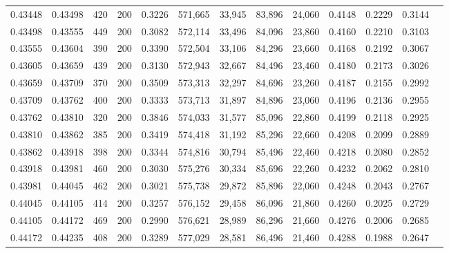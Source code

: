 \begin{tabular}{rrrrrrrrrrrrr}
0.43448 & 0.43498 &   420 & 200 &                                     0.3226 & 571,665 &  33,945 &  83,896 &  24,060 & 0.4148 & 0.2229 & 0.3144 \\
0.43498 & 0.43555 &   449 & 200 &                                     0.3082 & 572,114 &  33,496 &  84,096 &  23,860 & 0.4160 & 0.2210 & 0.3103 \\
0.43555 & 0.43604 &   390 & 200 &                                     0.3390 & 572,504 &  33,106 &  84,296 &  23,660 & 0.4168 & 0.2192 & 0.3067 \\
0.43605 & 0.43659 &   439 & 200 &                                     0.3130 & 572,943 &  32,667 &  84,496 &  23,460 & 0.4180 & 0.2173 & 0.3026 \\
0.43659 & 0.43709 &   370 & 200 &                                     0.3509 & 573,313 &  32,297 &  84,696 &  23,260 & 0.4187 & 0.2155 & 0.2992 \\
0.43709 & 0.43762 &   400 & 200 &                                     0.3333 & 573,713 &  31,897 &  84,896 &  23,060 & 0.4196 & 0.2136 & 0.2955 \\
0.43762 & 0.43810 &   320 & 200 &                                     0.3846 & 574,033 &  31,577 &  85,096 &  22,860 & 0.4199 & 0.2118 & 0.2925 \\
0.43810 & 0.43862 &   385 & 200 &                                     0.3419 & 574,418 &  31,192 &  85,296 &  22,660 & 0.4208 & 0.2099 & 0.2889 \\
0.43862 & 0.43918 &   398 & 200 &                                     0.3344 & 574,816 &  30,794 &  85,496 &  22,460 & 0.4218 & 0.2080 & 0.2852 \\
0.43918 & 0.43981 &   460 & 200 &                                     0.3030 & 575,276 &  30,334 &  85,696 &  22,260 & 0.4232 & 0.2062 & 0.2810 \\
0.43981 & 0.44045 &   462 & 200 &                                     0.3021 & 575,738 &  29,872 &  85,896 &  22,060 & 0.4248 & 0.2043 & 0.2767 \\
0.44045 & 0.44105 &   414 & 200 &                                     0.3257 & 576,152 &  29,458 &  86,096 &  21,860 & 0.4260 & 0.2025 & 0.2729 \\
0.44105 & 0.44172 &   469 & 200 &                                     0.2990 & 576,621 &  28,989 &  86,296 &  21,660 & 0.4276 & 0.2006 & 0.2685 \\
0.44172 & 0.44235 &   408 & 200 &                                     0.3289 & 577,029 &  28,581 &  86,496 &  21,460 & 0.4288 & 0.1988 & 0.2647 \\

\end{tabular}
